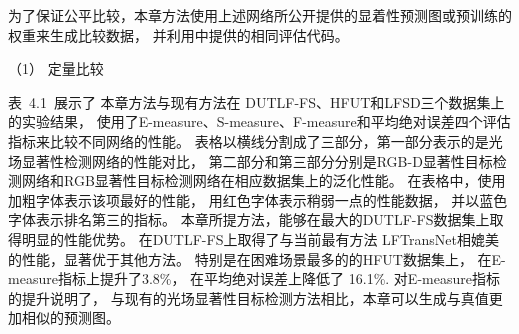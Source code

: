 %



为了保证公平比较，本章方法使用上述网络所公开提供的显着性预测图或预训练的权重来生成比较数据，
并利用中提供的相同评估代码。 





（1）
定量比较


表~4.1~展示了
本章方法与现有方法在
DUTLF-FS、HFUT和LFSD三个数据集上的实验结果，
使用了E-measure、S-measure、F-measure和平均绝对误差四个评估指标来比较不同网络的性能。
表格以横线分割成了三部分，第一部分表示的是光场显著性检测网络的性能对比，
第二部分和第三部分分别是RGB-D显著性目标检测网络和RGB显著性目标检测网络在相应数据集上的泛化性能。
在表格中，使用加粗字体表示该项最好的性能，
用红色字体表示稍弱一点的性能数据，
并以蓝色字体表示排名第三的指标。
本章所提方法，能够在最大的DUTLF-FS数据集上取得明显的性能优势。
在DUTLF-FS上取得了与当前最有方法
LFTransNet相媲美的性能，显著优于其他方法。
特别是在困难场景最多的的HFUT数据集上，
在E-measure指标上提升了3.8\%，
在平均绝对误差上降低了 16.1\%.
对E-measure指标的提升说明了，
与现有的光场显著性目标检测方法相比，本章可以生成与真值更加相似的预测图。


